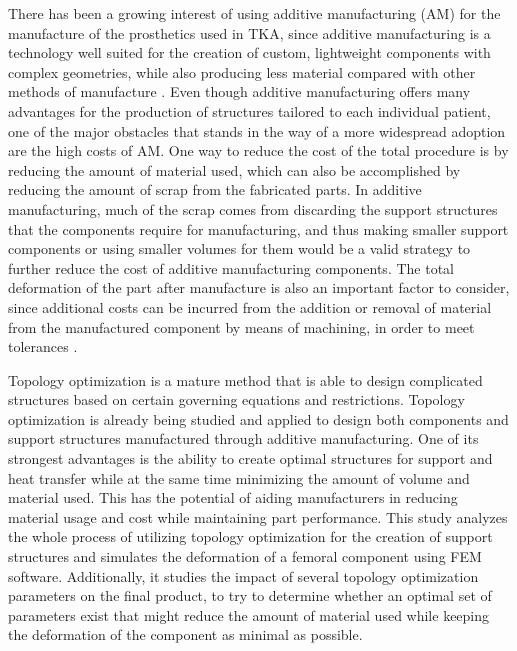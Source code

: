 \documentclass[../main.tex]{subfiles}
\begin{document}
There has been a growing interest of using additive manufacturing (AM) for the manufacture of the prosthetics used in TKA, since additive manufacturing is a technology well suited for the creation of custom, lightweight components with complex geometries, while also producing less material compared with other methods of manufacture \cite{narraAdditiveManufacturingTotal2019}. Even though additive manufacturing offers many advantages for the production of structures tailored to each individual patient, one of the major obstacles that stands in the way of a more widespread adoption are the high costs of AM. One way to reduce the cost of the total procedure is by reducing the amount of material used, which can also be accomplished by reducing the amount of scrap from the fabricated parts.  In additive manufacturing, much of the scrap comes from discarding the support structures that the components require for manufacturing, and thus making smaller support components or using smaller volumes for them would be a valid strategy to further reduce the cost of additive manufacturing components. The total deformation of the part after manufacture is also an important factor to consider, since additional costs can be incurred from the addition or removal of material from the manufactured component by means of machining, in order to meet tolerances \cite{narraAdditiveManufacturingTotal2019}. 

Topology optimization is a mature method that is able to design complicated structures based on certain governing equations and restrictions. Topology optimization is already being studied and applied to design both components and support structures manufactured through additive manufacturing. One of its strongest advantages is the ability to create optimal structures for support and heat transfer while at the same time minimizing the amount of volume and material used. This has the potential of aiding manufacturers in reducing material usage and cost while maintaining part performance. This study analyzes the whole process of utilizing topology optimization for the creation of support structures and simulates the deformation of a femoral component using FEM software. Additionally, it studies the impact of several topology optimization parameters on the final product, to try to determine whether an optimal set of parameters exist that might reduce the amount of material used while keeping the deformation of the component as minimal as possible.
\end{document}
